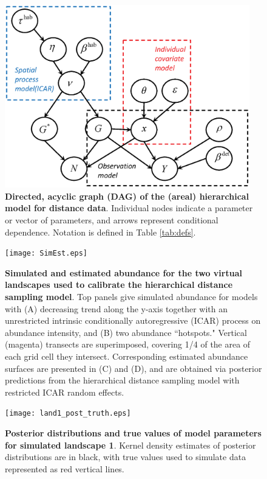 \documentclass[10pt]{article}
\begin{document}
\begin{figure}
\begin{center}
\includegraphics[width=0.95\textwidth]{DAG.eps}
\end{center}
\caption{{\bf Directed, acyclic graph (DAG) of the (areal) hierarchical model
for distance data}. Individual nodes indicate a parameter or vector of parameters, and arrows represent conditional dependence. Notation is defined in Table \ref{tab:defs}.}
\label{fig:DAG}
\end{figure}
\clearpage

\begin{figure}
\begin{center}
\texttt{[image: SimEst.eps]}
\end{center}
\caption{{\bf Simulated and estimated abundance for the two virtual landscapes used to calibrate the hierarchical distance sampling model}. Top panels give simulated abundance for models with (A) decreasing trend along the y-axis together with an unrestricted intrinsic conditionally autoregressive (ICAR) process on abundance intensity, and (B) two abundance ``hotspots." Vertical (magenta) transects are superimposed, covering 1/4 of the area of each grid cell they intersect.  Corresponding estimated abundance surfaces are presented in (C) and (D), and are obtained via posterior predictions from the hierarchical distance sampling model with restricted ICAR random effects.}
\label{fig:sim_landscape}
\end{figure}
\clearpage

\begin{figure}
\begin{center}
\texttt{[image: land1\_post\_truth.eps]}
\end{center}
\caption{{\bf Posterior distributions and true values of model parameters for simulated landscape 1}. Kernel density estimates of posterior distributions are in black, with true values used to simulate data represented as red vertical lines.}
\label{fig:land1_post_truth}
\end{figure}
\clearpage
\end{document}
